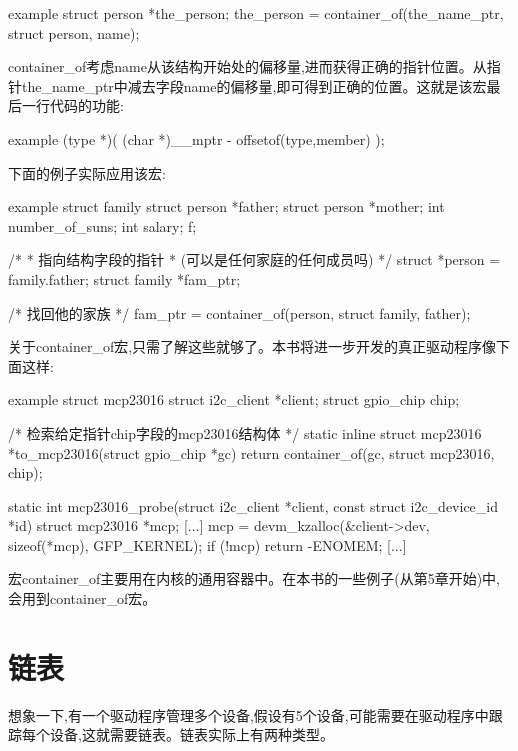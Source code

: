 \documentclass[lang=cn,newtx,10pt,scheme=chinese]{elegantbook}
\begin{document}
\begin{mycode}{example}
struct person *the_person;
the_person = container_of(the_name_ptr, struct person, name);
\end{mycode}

container\_of考虑name从该结构开始处的偏移量,进而获得正确的指针位置。从指针the\_name\_ptr中减去字段name的偏移量,即可得到正确的位置。这就是该宏最后一行代码的功能:

\begin{mycode}{example}
(type *)( (char *)__mptr - offsetof(type,member) );
\end{mycode}

下面的例子实际应用该宏:

\begin{mycode}{example}
struct family {
    struct person *father;
    struct person *mother;
    int number_of_suns;
    int salary;
} f;

/*
* 指向结构字段的指针
* (可以是任何家庭的任何成员吗)
*/
struct *person = family.father;
struct family *fam_ptr;

/* 找回他的家族 */
fam_ptr = container_of(person, struct family, father);
\end{mycode}

关于container\_of宏,只需了解这些就够了。本书将进一步开发的真正驱动程序像下面这样:

\begin{mycode}{example}
struct mcp23016 {
    struct i2c_client *client;
    struct gpio_chip chip;
}

/* 检索给定指针chip字段的mcp23016结构体 */
static inline struct mcp23016 *to_mcp23016(struct gpio_chip *gc)
{
    return container_of(gc, struct mcp23016, chip);
}

static int mcp23016_probe(struct i2c_client *client, const struct i2c_device_id *id)
{
    struct mcp23016 *mcp;
    [...]
    mcp = devm_kzalloc(&client->dev, sizeof(*mcp), GFP_KERNEL);
    if (!mcp)
        return -ENOMEM;
    [...]
}
\end{mycode}

宏container\_of主要用在内核的通用容器中。在本书的一些例子(从第5章开始)中,会用到container\_of宏。

\section{链表}

想象一下,有一个驱动程序管理多个设备,假设有5个设备,可能需要在驱动程序中跟踪每个设备,这就需要链表。链表实际上有两种类型。
\end{document}
